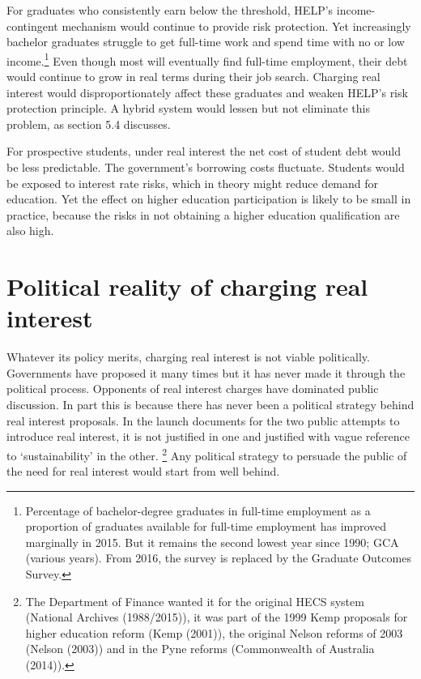 \documentclass[embargoed]{grattan}
\begin{document}
For graduates who consistently earn below the threshold, \gls{HELP}'s income-contingent mechanism would continue to provide risk protection.
Yet increasingly bachelor graduates struggle to get full-time work and spend time with no or low income.\footnote{Percentage of bachelor-degree graduates in full-time employment as a proportion of graduates available for full-time employment has improved marginally in 2015.
But it remains the second lowest year since 1990; GCA (various years).
From 2016, the survey is replaced by the Graduate Outcomes Survey.} Even though most will eventually find full-time employment, their debt would continue to grow in real terms during their job search.
Charging real interest would disproportionately affect these graduates and weaken \gls{HELP}'s risk protection principle.
A hybrid system would lessen but not eliminate this problem, as section 5.4 discusses.

For prospective students, under real interest the net cost of student debt would be less predictable.
The government's borrowing costs fluctuate.
Students would be exposed to interest rate risks, which in theory might reduce demand for education.
Yet the effect on higher education participation is likely to be small in practice, because the risks in not obtaining a higher education qualification are also high.

\section{Political reality of charging real interest}\label{political-reality-of-charging-real-interest}

Whatever its policy merits, charging real interest is not viable politically.
Governments have proposed it many times but it has never made it through the political process.
Opponents of real interest charges have dominated public discussion.
In part this is because there has never been a political strategy behind real interest proposals.
In the launch documents for the two public attempts to introduce real interest, it is not justified in one and justified with vague reference to `sustainability' in the other.%
\footnote{The Department of Finance wanted it for the original \gls{HECS} system (National Archives (1988/2015)), it was part of the 1999 Kemp proposals for higher education reform (Kemp (2001)), the original Nelson reforms of 2003 (Nelson (2003)) and in the Pyne reforms (Commonwealth of Australia (2014)).} Any political strategy to persuade the public of the need for real interest would start from well behind.
\end{document}
